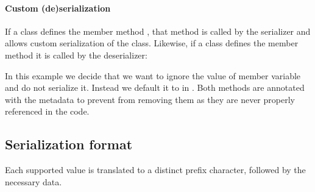 \paragraph{Custom (de)serialization}

If a class defines the member method , that method is called by the serializer and allows custom serialization of the class. Likewise, if a class defines the member method  it is called by the deserializer:


In this example we decide that we want to ignore the value of member variable  and do not serialize it. Instead we default it to  in . Both methods are annotated with the  metadata to prevent  from removing them as they are never properly referenced in the code.


\subsection{Serialization format}
\label{std-serialization-format}

Each supported value is translated to a distinct prefix character, followed by the necessary data.

